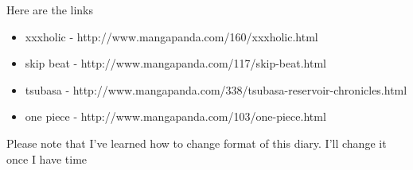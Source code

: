 
Here are the links

\begin{itemize}
\item xxxholic - http://www.mangapanda.com/160/xxxholic.html
\item skip beat - http://www.mangapanda.com/117/skip-beat.html
\item tsubasa - http://www.mangapanda.com/338/tsubasa-reservoir-chronicles.html
\item one piece - http://www.mangapanda.com/103/one-piece.html
\end{itemize}



Please note that I've learned how to change format of this diary. I'll change it once I have time

